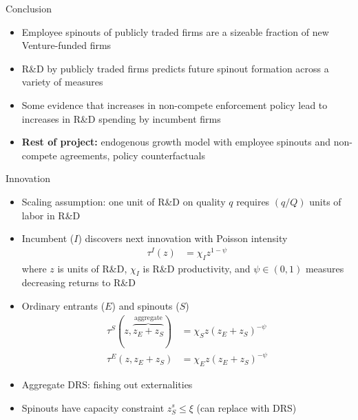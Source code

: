 \documentclass[english,usenames,dvipsnames]{beamer}
\begin{document}
\begin{frame}{Conclusion}
\begin{itemize}
	\item Employee spinouts of publicly traded firms are a sizeable fraction of new Venture-funded firms
	\item R\&D by publicly traded firms predicts future spinout formation across a variety of measures 
	\item Some evidence that increases in non-compete enforcement policy lead to increases in R\&D spending by incumbent firms
	\item \textbf{Rest of project: }endogenous growth model with employee spinouts and non-compete agreements, policy counterfactuals
\end{itemize}
\end{frame}

\begin{frame}{Innovation}
\begin{itemize}
	\item Scaling assumption: one unit of R\&D on quality $q$ requires $(q/Q)$ units of labor in R\&D
	\item Incumbent ($I$) discovers next innovation with Poisson intensity
	\begin{align*}
	\tau^I(z) &= \chi_I z^{1-\psi}
	\end{align*}
	where $z$ is units of R\&D, $\chi_I$ is R\&D productivity, and $\psi \in (0,1)$ measures decreasing returns to R\&D 
	\item Ordinary entrants ($E$) and spinouts ($S$) 
	\begin{align*}
	\tau^S(z,\overbrace{z_E+z_S}^{\textrm{aggregate}}) &= \chi_{S} z (z_E + z_S)^{-\psi} \\
	\tau^E(z,z_E+z_S) &= \chi_{E} z (z_E + z_S)^{-\psi}
	\end{align*}
	\item Aggregate DRS: \alert{fishing out} externalities
	\item Spinouts have \alert{capacity constraint} $z_S^s \le \xi$ (can replace with DRS)
\end{itemize}
\end{frame}
\end{document}

